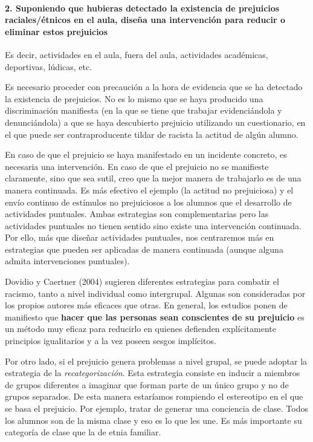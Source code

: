 \documentclass[palatino,nochap]{apuntesURJC}
\begin{document}
\paragraph{2. Suponiendo que hubieras detectado la existencia de prejuicios
raciales/étnicos en el aula, diseña una intervención para reducir o eliminar estos prejuicios} Es decir, actividades en el aula, fuera del aula, actividades académicas,
deportivas, lúdicas, etc.

Es necesario proceder con precaución a la hora de evidencia que se ha detectado la existencia de prejuicios.
%
No es lo mismo que se haya producido una discriminación manifiesta (en la que se tiene que trabajar evidenciándola y denunciándola) a que se haya descubierto prejuicio utilizando un cuestionario, en el que puede ser contraproducente tildar de racista la actitud de algún alumno.

En caso de que el prejuicio se haya manifestado en un incidente concreto, es necesaria una intervención.
%
En caso de que el prejuicio no se manifieste claramente, sino que sea sutil, creo que la mejor manera de trabajarlo es de una manera continuada. 
%
Es más efectivo el ejemplo (la actitud no prejuiciosa) y el envío continuo de estímulos no prejuiciosos a los alumnos que el desarrollo de actividades puntuales.
%
Ambas estrategias son complementarias pero las actividades puntuales no tienen sentido sino existe una intervención continuada.
%
Por ello, más que diseñar actividades puntuales, nos centraremos más en estrategias que pueden ser aplicadas de manera continuada (aunque alguna admita intervenciones puntuales).


Dovidio y Caertner (2004) sugieren diferentes estrategias para combatir el racismo, tanto a nivel individual como intergrupal.
%
Algunas son consideradas por los propios autores más eficaces que otras.
%
En general, los estudios ponen de manifiesto que \textbf{hacer que las personas sean conscientes de su prejuicio} es un método muy eficaz para reducirlo en quienes defienden explícitamente principios igualitarios y a la vez poseen sesgos implícitos.

Por otro lado, si el prejuicio genera problemas a nivel grupal, se puede adoptar la estrategia de la \textit{recategorización}. 
%
Esta estrategia consiste en inducir a miembros de grupos diferentes a imaginar que forman parte de un único grupo y no de grupos separados.
%
De esta manera estaríamos rompiendo el estereotipo en el que se basa el prejuicio.
%
Por ejemplo, tratar de generar una conciencia de clase. Todos los alumnos son de la misma clase y eso es lo que les une.
%
Es más importante su categoría de clase que la de etnia familiar.
\end{document}
